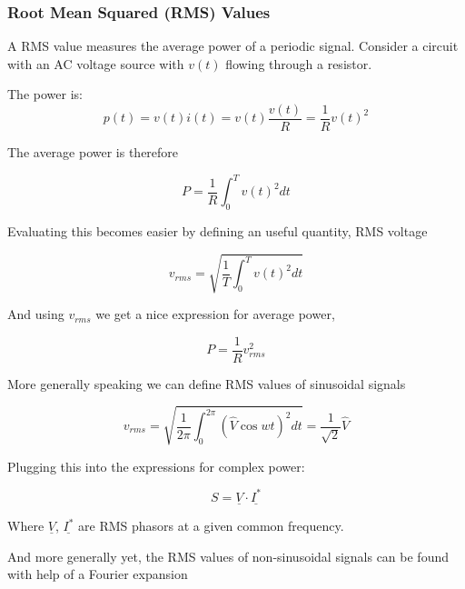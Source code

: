 \documentclass[10pt]{article}
\begin{document}
\subsubsection{Root Mean Squared (RMS) Values}


A RMS value measures the average power of a periodic signal. Consider a circuit with an AC voltage source with $ v(t) $ flowing through a resistor. 


The power is:
\begin{equation}
	p(t) = v(t) i(t) = v(t) \frac{v(t)}{R} = \frac{1}{R} v(t)^2
\end{equation}

The average power is therefore

\begin{equation}
	P = \frac{1}{R} \int_0^T v(t)^2 dt
\end{equation}


Evaluating this becomes easier by defining an useful quantity, RMS voltage

\begin{equation}
	v_{rms} = \sqrt{\frac{1}{T} \int^T_0 v(t)^2 dt} 
\end{equation}
	

And using $ v_{rms} $ we get a nice expression for average power,

\begin{equation}
	P = \frac{1}{R} v_{rms}^2
\end{equation}



More generally speaking we can define RMS values of sinusoidal signals

\begin{definition}
	\begin{equation}
		v_{rms} = \sqrt{\frac{1}{2\pi} \int^{2\pi}_0 (\hat{V} \cos wt )^2 dt}  = \frac{1}{\sqrt{2}}  \hat{V}
	\end{equation}
\end{definition}


Plugging this into the expressions for complex power:

\begin{equation}
	S = \underline{V} \cdot \underline{I^*}
\end{equation}

Where $ \underline{V} $, $ \underline{I^*} $ are RMS phasors at a given common frequency.


And more generally yet, the RMS values of non-sinusoidal signals can be found with help of a Fourier expansion
\end{document}
